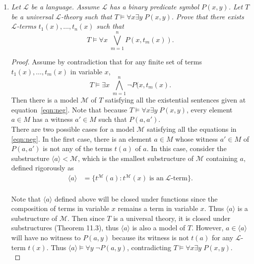\documentclass{article}
\begin{document}
\begin{enumerate}[label={\bf Q\arabic*:}]
\begin{proof}
      Taking union $i=\cup_{r\in\omega}i_r$ will give us an
      order and rationality-preserving isomorphism between $M$ and $N$,
      thus $T$ is $\omega$-categorical.
    \end{proof}

  \item \it Let $\mathcal{L}$ be a language. Assume $\mathcal{L}$ has a
    binary predicate symbol $P(x,y)$. Let $T$ be a universal
    $\mathcal{L}$-theory such that $T\models\forall x\exists y\; P(x,y)$.
    Prove that there exists $\mathcal{L}$-terms $t_1(x),\ldots,t_n(x)$ such
    that \[T\models\forall x\; \bigvee_{m=1}^n P(x,t_m(x)).\]
    \begin{proof}
      Assume by contradiction that for any finite set of terms
      $t_1(x),\ldots,t_m(x)$ in variable $x$,
      \begin{equation}
        \tag{$*$}
        T\models\exists x\; \bigwedge_{m=1}^n \neg P(x,t_m(x).
        \label{eqn:neg}
      \end{equation}
      Then there is a model $\mathcal{M}$ of $T$ satisfying all the
      existential sentences given at equation~\eqref{eqn:neg}. Note that
      because $T\models\forall x\exists y\; P(x,y)$, every element $a\in M$
      has a witness $a'\in M$ such that $P(a,a')$. \\

      There are two possible cases for a model $\mathcal{M}$ satisfying all
      the equations in \eqref{eqn:neg}. In the first case, there is an
      element $a\in M$ whose witness $a'\in M$ of $P(a,a')$ is not any of the
      terms $t(a)$ of $a$. In this case, consider the substructure $\langle
      a\rangle<\mathcal{M}$, which is the smallest substructure of
      $\mathcal{M}$ containing $a$, defined rigorously as
      \begin{align*}
        \langle a\rangle &=\{t^\mathcal{M}(a):
          t^\mathcal{M}(x)\; \text{is an}\; \mathcal{L}\text{-term}\}. \\
      \end{align*}

      Note that $\langle a\rangle$ defined above will be closed under
      functions since the composition of terms in variable $x$ remains a
      term in variable $x$. Thus $\langle a\rangle$ is a substructure of
      $\mathcal{M}$. Then since $T$ is a universal theory, it is closed
      under substructures (Theorem 11.3), thus $\langle a\rangle$ is also a
      model of $T$. However, $a\in\langle a\rangle$ will have no witness to
      $P(a,y)$ because its witness is not $t(a)$ for any $\mathcal{L}$-term
      $t(x)$. Thus $\langle a\rangle\models\forall y\; \neg P(a,y)$,
      contradicting $T\models\forall x\exists y\; P(x,y)$. \\


\end{proof}
\end{enumerate}
\end{document}
